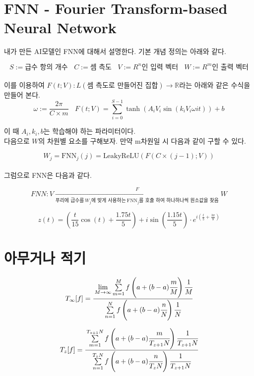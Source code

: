 \documentclass{book}
\begin{document}
\chapter{FNN - Fourier Transform-based Neural Network}

내가 만든 AI모델인 FNN에 대해서 설명한다. 기본 개념 정의는 아래와 같다.

\[
S :=\text{급수 항의 개수}~~~~ C:=\text{셈 측도} ~~~~ V:=R^n\text{인 입력 벡터} ~~~~ W:=R^m\text{인 출력 벡터}
\]\\

이를 이용하여 $F(t;V):L(\text{셈 측도로 만들어진 집합})\rightarrow \mathbb{R}$라는 아래와 같은 수식을 만들어 본다.
\[
\omega:=\frac{2 \pi}{C \times m} ~~~~ F(t;V)= \sum_{i=0}^{S-1} \tanh \left ( A_i V_i \sin \left ( k_i V_i \omega i t \right ) \right ) + b
\]

이 때 $A_i, k_i, b$는 학습해야 하는 파라미터이다.\\

다음으로 $W$의 차원별 요소를 구해보자. 만약 m차원일 시 다음과 같이 구할 수 있다.

\[
W_j = \text{FNN}_j(j) = \text{LeakyReLU}( F(C \times (j-1);V))
\]\\

그럼으로 FNN은 다음과 같다.

\[
FNN:V\xrightarrow[\text{푸리에 급수를}~W_j\text{에 맞게 사용하는}~\text{FNN}_j\text{를 호출 하여 하나하나씩 원소값을 찾음}]{F}W
\]

$$z(t) = \left( \frac{t}{15}\cos(t) + \frac{1.75t}{5} \right) + i\sin\left(\frac{1.15t}{5}\right) \cdot e^{i\left(\frac{t}{5} + \frac{3\pi}{8}\right)}$$

\chapter{아무거나 적기}

\[
T_{\infty}[f] = \cfrac{\lim \limits_{M \to \infty} \sum \limits_{m=1}^{M} f \left (a+ (b - a) \cfrac{m}{M} \right ) \cfrac{1}{M} }{ \sum \limits_{n=1}^{N} f \left (a+ (b - a) \cfrac{n}{N} \right ) \cfrac{1}{N} }
\]

\[
T_z[f] = \cfrac{\sum \limits_{m=1}^{T_{z+1}N} f \left (a+ (b - a) \cfrac{m}{T_{z+1}N} \right ) \cfrac{1}{T_{z+1}N} }{ \sum \limits_{n=1}^{T_{z}N} f \left (a+ (b - a) \cfrac{n}{T_{z}N} \right ) \cfrac{1}{T_{z+1}N} }
\]
\end{document}
